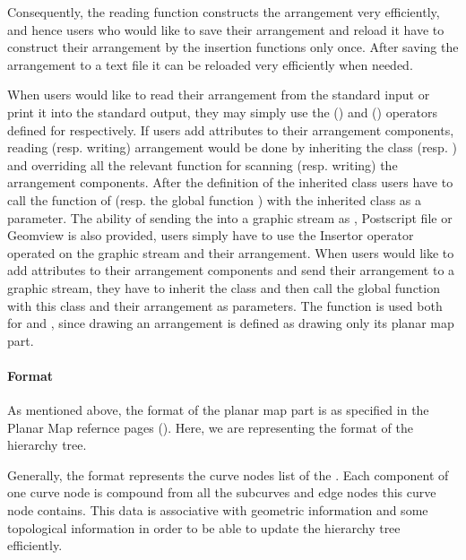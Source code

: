 \begin{ccAdvanced}
Consequently, the reading function constructs the arrangement very 
efficiently, and hence users who would like to save their arrangement and reload it have to construct their 
arrangement by the insertion functions only once.
After saving the arrangement to a text file it can be reloaded very efficiently when needed.

When users would like to read their arrangement from the standard input or print it into 
the standard output, they may simply use the  (\ccc{ >> }) and  (\ccc{ << }) 
operators defined for  respectively. 
If users add attributes to their arrangement components, reading (resp. writing) arrangement would 
be done by inheriting the class   (resp.  ) 
and overriding all the relevant function for scanning (resp. writing) the arrangement components. 
After the definition of the inherited class users have to call the function 
 of  (resp. the global function  ) with 
the inherited class as a parameter.
The ability of sending the  into a graphic stream as , 
Postscript file or Geomview is also provided, 
users simply have to use the Insertor operator operated on the graphic stream and their arrangement. 
When users would like to add attributes to their arrangement components 
and send their arrangement to a graphic stream, 
they have to inherit the class  and then call the global function  
with this class and their arrangement as parameters.
The function   is used both for  and , since drawing 
an arrangement is defined as drawing only its planar map part.

\paragraph{Format}
As mentioned above, the format of the planar map part is as specified 
in the Planar Map refernce pages (). 
Here, we are representing the format of the hierarchy tree.

Generally, the format represents the curve nodes list of the . 
Each component of one curve node is compound from all the subcurves and edge nodes 
this curve node contains. This data is associative with geometric information and some 
topological information in order to be able to update the hierarchy tree efficiently. 


\end{ccAdvanced}
